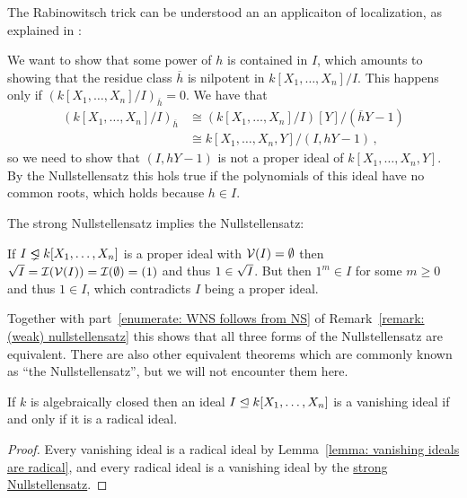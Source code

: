 \begin{remark}
  The Rabinowitsch trick can be understood an an applicaiton of localization, as explained in \cite{MO90666}:
  
  We want to show that some power of $h$ is contained in $I$, which amounts to showing that the residue class $\overline{h}$ is nilpotent in $k[X_1, \dotsc, X_n]/I$.
  This happens only if $(k[X_1, \dotsc, X_n]/I)_{\overline{h}} = 0$.
  We have that
  \begin{align*}
            (k[X_1, \dotsc, X_n]/I)_{\overline{h}}
    &\cong  (k[X_1, \dotsc, X_n]/I)[Y]/(\overline{h}Y - 1)  \\
    &\cong  k[X_1, \dotsc, X_n,Y]/(I, hY - 1) \,,
  \end{align*}
  so we need to show that $(I, hY - 1)$ is not a proper ideal of $k[X_1, \dotsc, X_n, Y]$.
  By the Nullstellensatz this hols true if the polynomials of this ideal have no common roots, which holds because $h \in I$.
\end{remark}


\begin{remark}
  The strong Nullstellensatz implies the Nullstellensatz:
  
  If $I \idealneq k[X_1, \dotsc, X_n]$ is a proper ideal with $\mathcal{V}(I) = \emptyset$ then $\sqrt{I} = \mathcal{I}(\mathcal{V}(I)) = \mathcal{I}(\emptyset) = (1)$ and thus $1 \in \sqrt{I}$.
  But then $1^m \in I$ for some $m \geq 0$ and thus $1 \in I$, which contradicts $I$ being a proper ideal.
  
  Together with part~\ref*{enumerate: WNS follows from NS} of Remark~\ref{remark: (weak) nullstellensatz} this shows that all three forms of the Nullstellensatz are equivalent.
  There are also other equivalent theorems which are commonly known as \enquote{the Nullstellensatz}, but we will not encounter them here.
\end{remark}




\begin{corollary}
  \label{corollary: vanishing ideals are precisely radical ideals}
  If $k$ is algebraically closed then an ideal $I \trianglelefteq k[X_1, \dotsc, X_n]$ is a vanishing ideal if and only if it is a radical ideal.
\end{corollary}


\begin{proof}
  Every vanishing ideal is a radical ideal by Lemma~\ref{lemma: vanishing ideals are radical}, and every radical ideal is a vanishing ideal by the \hyperref[theorem: strong nullstellensatz]{strong Nullstellensatz}.
\end{proof}



